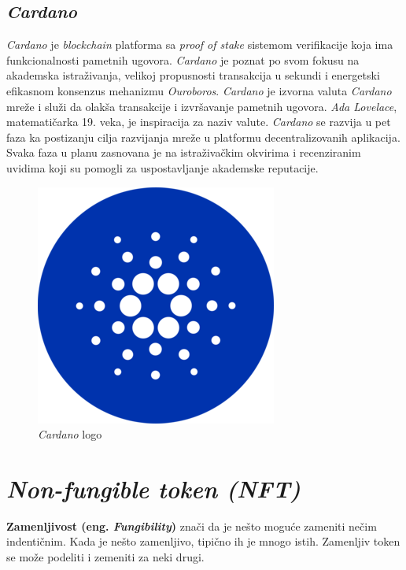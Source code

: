 \documentclass[a4paper]{article}
\begin{document}
{\subsection{\emph{Cardano}}
\label{subsec:cardano}
\emph{Cardano} je  \emph{blockchain} platforma sa \emph{proof of stake} sistemom verifikacije koja ima funkcionalnosti pametnih ugovora. \emph{Cardano} je poznat po svom fokusu na akademska istraživanja, velikoj propusnosti transakcija u sekundi i energetski efikasnom konsenzus mehanizmu \emph{Ouroboros}. \emph{Cardano} je izvorna valuta \emph{Cardano} mreže i služi da olakša transakcije i izvršavanje pametnih ugovora. \emph{Ada Lovelace}, matematičarka 19. veka, je inspiracija za naziv valute. \emph{Cardano} se razvija u pet faza ka postizanju cilja razvijanja mreže u platformu decentralizovanih aplikacija. Svaka faza u planu zasnovana je na istraživačkim okvirima i recenziranim uvidima koji su pomogli za uspostavljanje akademske reputacije.\cite{različitekriptovalute}

\begin{figure}[h!]
\begin{center}
\includegraphics[scale=0.4]{slike/slika5.png}
\end{center}
\caption{\emph{Cardano} logo}
\label{fig:cardano} 
\end{figure}


\newpage

\section{\emph{Non-fungible token (NFT)}}
\label{sec:nft}
\textbf{Zamenljivost (eng. \emph{Fungibility})} znači da je nešto moguće zameniti nečim indentičnim. Kada je nešto zamenljivo, tipično ih je mnogo istih. Zamenljiv token se može podeliti i zemeniti za neki drugi.

}
\end{document}
